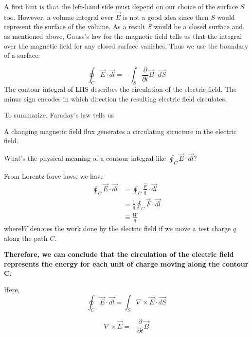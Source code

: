 A first hint is that the left-hand side must depend on our choice of the surface $S$ too. However, a volume integral over $\vec{E}$ is not a good idea since then $S$ would represent the surface of the volume. As a result $S$ would be a closed surface and, as mentioned above, Gauss's law for the magnetic field tells us that the integral over the magnetic field for any closed surface vanishes. Thus we use the boundary of a surface:
\begin{qt}
    \begin{equation}
\oint_{\mathrm{C}} \vec{E} \cdot \overrightarrow{d l}=-\int_{S} \frac{\partial}{\partial t} \vec{B} \cdot \overrightarrow{d S}
\end{equation}
The contour integral of LHS describes the circulation of the electric field. The minus sign encodes in which direction the resulting electric field circulates.
\end{qt}
To summarize, Faraday's law tells us
\begin{qt}
    A changing magnetic field flux generates a circulating structure in the electric field.
\end{qt}
\begin{mybox}
What's the physical meaning of a contour integral like $\oint_{C} \vec{E} \cdot \overrightarrow{d l}$?
\end{mybox}
\begin{mybox2}
From Lorentz force laws, we have 
$$
\begin{aligned}
\oint_{C} \vec{E} \cdot \overrightarrow{d l} &=\oint_{C} \frac{\vec{F}}{q} \cdot \overrightarrow{d l} \\
&=\frac{1}{q} \oint_{C} \vec{F} \cdot \overrightarrow{d l} \\
& \equiv \frac{W}{q}
\end{aligned}
$$
where$W$ denotes the work done by the electric field if we move a test charge $q$ along the path $C$.

\textbf{Therefore, we can conclude that the circulation of the electric field represents the energy for each unit of charge moving along the contour C.}
\end{mybox2}
Here, 
\begin{equation}
\oint_{C} \vec{E} \cdot \overrightarrow{d l}=\int_{S} \nabla \times \vec{E} \cdot \overrightarrow{d S}
\end{equation}
\begin{qt}
    \begin{equation}
\nabla \times \vec{E}=-\frac{\partial}{\partial t} \vec{B}
\end{equation}
\end{qt}
